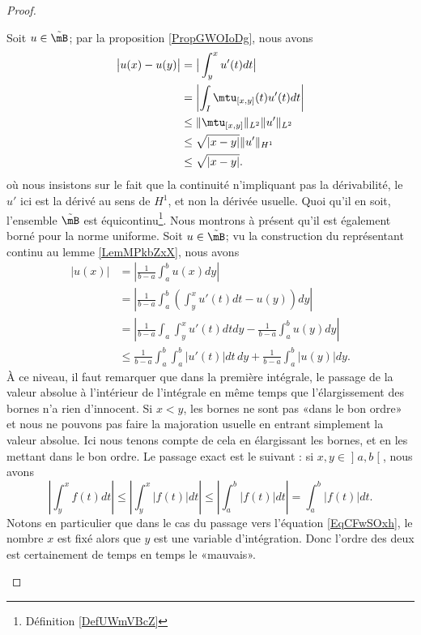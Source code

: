 \begin{proof}
\begin{enumerate}
            Soit \( u\in \tilde \mB\); par la proposition \ref{PropGWOIoDg}, nous avons
            \begin{subequations}
                \begin{align}
                    \big| u(x)-u(y) \big|&=\big| \int_y^xu'(t)dt \big|\\
                    &=\left| \int_I\mtu_{[x,y]}(t)u'(t)dt \right| \\
                    &\leq\| \mtu_{\mathopen[ x , y \mathclose]} \|_{L^2}\| u' \|_{L^2}\\
                    &\leq\sqrt{| x-y |}\| u' \|_{H^1}\\
                    &\leq\sqrt{| x-y |}.
                \end{align}
            \end{subequations}
            où nous insistons sur le fait que la continuité n'impliquant pas la dérivabilité, le \( u'\) ici est la dérivé au sens de \( H^1\), et non la dérivée usuelle. Quoi qu'il en soit, l'ensemble \(\tilde  \mB\) est équicontinu\footnote{Définition \ref{DefUWmVBcZ}}. Nous montrons à présent qu'il est également borné pour la norme uniforme. Soit \( u\in\tilde \mB\); vu la construction du représentant continu au lemme \ref{LemMPkbZxX}, nous avons
            \begin{subequations}
                \begin{align}
                \big| u(x) \big|&=\left| \frac{1}{ b-a }\int_a^bu(x)dy \right| \\
                &=\left| \frac{1}{ b-a }\int_a^b\left( \int_y^xu'(t)dt-u(y) \right)dy \right| \\
                &=\left| \frac{1}{ b-a }\int_a\int_y^xu'(t)dtdy-\frac{1}{ b-a }\int_a^b u(y)dy \right| \\
                &\leq\frac{1}{ b-a }\int_a^b\int_a^b| u'(t) |dt\,dy+\frac{1}{ b-a }\int_a^b| u(y) |dy \label{EqCFwSOxh}.
                \end{align}
            \end{subequations}
            À ce niveau, il faut remarquer que dans la première intégrale, le passage de la valeur absolue à l'intérieur de l'intégrale en même temps que l'élargissement des bornes n'a rien d'innocent. Si \( x<y\), les bornes ne sont pas «dans le bon ordre» et nous ne pouvons pas faire la majoration usuelle en entrant simplement la valeur absolue. Ici nous tenons compte de cela en élargissant les bornes, et en les mettant dans le bon ordre. Le passage exact est le suivant : si \( x,y\in\mathopen] a , b \mathclose[\), nous avons
                \begin{equation}
                \left| \int_y^xf(t)dt \right| \leq\left| \int_y^x| f(t) |dt \right| \leq\left| \int_a^b| f(t) |dt \right| =\int_a^b| f(t) |dt.
                \end{equation}
                Notons en particulier que dans le cas du passage vers l'équation \eqref{EqCFwSOxh}, le nombre \( x\) est fixé alors que \( y\) est une variable d'intégration. Donc l'ordre des deux est certainement de temps en temps le «mauvais».


\end{enumerate}
\end{proof}
